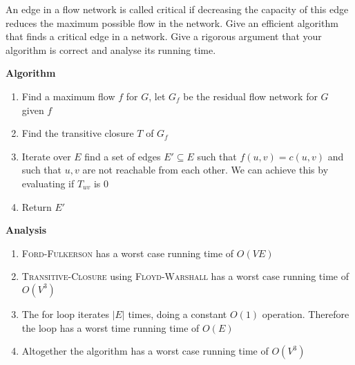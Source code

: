\documentclass[11pt]{article}
\begin{document}
An edge in a flow network is called critical if decreasing the capacity of this edge reduces the maximum possible flow in the network. Give an efficient algorithm that finds a critical edge in a network. Give a rigorous argument that your algorithm is correct and analyse its running time.

\begin{solution}

    \textbf{Algorithm}
    \begin{enumerate}
        \item Find a maximum flow $f$ for $G$, let $G_f$ be the residual flow network for $G$ given $f$
        \item Find the transitive closure $T$ of $G_f$
        \item Iterate over $E$ find a set of edges $E' \subseteq E$ such that $f(u,v) = c(u,v)$ and such that $u,v$ are not reachable from each other. We can achieve this by evaluating if $T_{uv}$ is 0
        \item Return $E'$ 
    \end{enumerate}
    \textbf{Analysis}
    \begin{enumerate}
        \item \textsc{Ford-Fulkerson} has a worst case running time of $O(VE)$
        \item \textsc{Transitive-Closure} using \textsc{Floyd-Warshall} has a worst case running time of $O(V^3)$ 
        \item The for loop iterates $|E|$ times, doing a constant $O(1)$ operation. Therefore the loop has a worst time running time of $O(E)$
        \item Altogether the algorithm has a worst case running time of $O(V^3)$ 
    \end{enumerate}

    \begin{algorithm}[H]

    \end{algorithm}


\end{solution}
\end{document}
